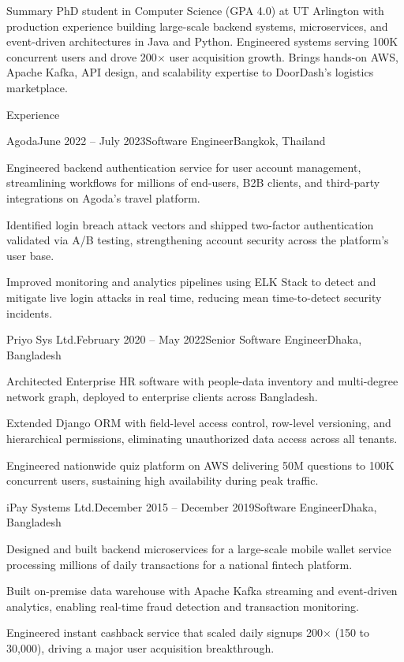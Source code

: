 \documentclass{resume}
\begin{document}
\begin{rSection}{Summary}
PhD student in Computer Science (GPA 4.0) at UT Arlington with production experience building
large-scale backend systems, microservices, and event-driven architectures in Java and Python.
Engineered systems serving 100K concurrent users and drove 200$\times$ user acquisition growth.
Brings hands-on AWS, Apache Kafka, API design, and scalability expertise to DoorDash's logistics marketplace.
\end{rSection}

\begin{rSection}{Experience}

\begin{rSubsection}{Agoda}{June 2022 -- July 2023}{Software Engineer}{Bangkok, Thailand}
  \item Engineered backend authentication service for user account management, streamlining workflows
        for millions of end-users, B2B clients, and third-party integrations on Agoda's travel platform.
  \item Identified login breach attack vectors and shipped two-factor authentication validated via A/B
        testing, strengthening account security across the platform's user base.
  \item Improved monitoring and analytics pipelines using ELK Stack to detect and mitigate live login
        attacks in real time, reducing mean time-to-detect security incidents.
\end{rSubsection}

\begin{rSubsection}{Priyo Sys Ltd.}{February 2020 -- May 2022}{Senior Software Engineer}{Dhaka, Bangladesh}
  \item Architected Enterprise HR software with people-data inventory and multi-degree network graph,
        deployed to enterprise clients across Bangladesh.
  \item Extended Django ORM with field-level access control, row-level versioning, and hierarchical
        permissions, eliminating unauthorized data access across all tenants.
  \item Engineered nationwide quiz platform on AWS delivering 50M questions to 100K concurrent users,
        sustaining high availability during peak traffic.
\end{rSubsection}

\begin{rSubsection}{iPay Systems Ltd.}{December 2015 -- December 2019}{Software Engineer}{Dhaka, Bangladesh}
  \item Designed and built backend microservices for a large-scale mobile wallet service processing
        millions of daily transactions for a national fintech platform.
  \item Built on-premise data warehouse with Apache Kafka streaming and event-driven analytics,
        enabling real-time fraud detection and transaction monitoring.
  \item Engineered instant cashback service that scaled daily signups 200$\times$ (150 to 30,000),
        driving a major user acquisition breakthrough.
\end{rSubsection}


\end{rSection}
\end{document}
